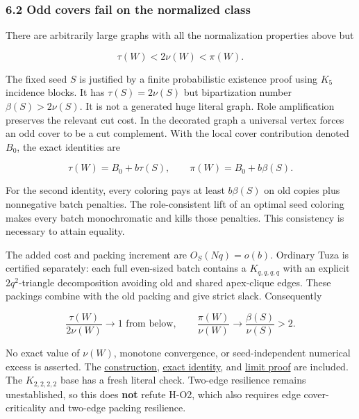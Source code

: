 \documentclass[11pt,a4paper]{article}
\begin{document}
\subsubsection{6.2 Odd covers fail on the normalized class}\label{odd-covers-fail-on-the-normalized-class}

There are arbitrarily large graphs with all the normalization properties above but

\[\tau(W)<2\nu(W)<\pi(W).\]

The fixed seed \(S\) is justified by a finite probabilistic existence proof using \(K_5\) incidence blocks. It has \(\tau(S)=2\nu(S)\) but bipartization number \(\beta(S)>2\nu(S)\). It is not a generated huge literal graph. Role amplification preserves the relevant cut cost. In the decorated graph a universal vertex forces an odd cover to be a cut complement. With the local cover contribution denoted \(B_0\), the exact identities are

\[\tau(W)=B_0+b\tau(S),\qquad \pi(W)=B_0+b\beta(S).\]

For the second identity, every coloring pays at least \(b\beta(S)\) on old copies plus nonnegative batch penalties. The role-consistent lift of an optimal seed coloring makes every batch monochromatic and kills those penalties. This consistency is necessary to attain equality.

The added cost and packing increment are \(O_S(Nq)=o(b)\). Ordinary Tuza is certified separately: each full even-sized batch contains a \(K_{q,q,q,q}\) with an explicit \(2q^2\)-triangle decomposition avoiding old and shared apex-clique edges. These packings combine with the old packing and give strict slack. Consequently

\[\frac{\tau(W)}{2\nu(W)}\longrightarrow1\text{ from below},\qquad
\frac{\pi(W)}{\nu(W)}\longrightarrow\frac{\beta(S)}{\nu(S)}>2.\]

No exact value of \(\nu(W)\), monotone convergence, or seed-independent numerical excess is asserted. The \href{https://github.com/pappa211/ai-math-experiments/blob/main/problems/TUZA-19/notes/root_batched_odd_cover_obstruction.md}{construction}, \href{https://github.com/pappa211/ai-math-experiments/blob/main/problems/TUZA-19/notes/root_batched_odd_cover_exact_identity.md}{exact identity}, and \href{https://github.com/pappa211/ai-math-experiments/blob/main/problems/TUZA-19/notes/root_batched_odd_asymptotic_slack.md}{limit proof} are included. The \(K_{2,2,2,2}\) base has a fresh literal check. Two-edge resilience remains unestablished, so this does \textbf{not} refute H-O2, which also requires edge cover-criticality and two-edge packing resilience.
\end{document}
